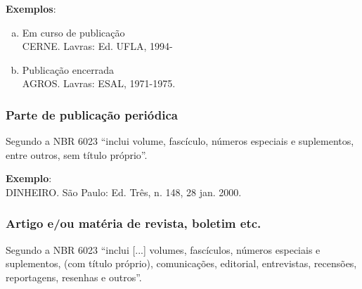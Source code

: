 \begin{exemplomanual}
\textbf{Exemplos}:\\
\begin{enumerate}[a)]
  \item  Em curso de publicação\\
CERNE. Lavras: Ed. UFLA, 1994-
  \item  Publicação encerrada\\
AGROS. Lavras: ESAL, 1971-1975.
\end{enumerate}
\end{exemplomanual}


\subsubsection{Parte de publicação periódica}

Segundo a NBR 6023 \cite{NBR6023:2002} ``inclui volume, fascículo, números especiais e suplementos, entre outros, sem título próprio''.

\begin{flushleft}
\begin{singlespace}
\end{singlespace}
\end{flushleft}

\begin{exemplomanual}
\textbf{Exemplo}:\\
DINHEIRO. São Paulo: Ed. Três, n. 148, 28 jan. 2000.
\end{exemplomanual}


\subsubsection{Artigo e/ou matéria de revista, boletim etc.}

Segundo a NBR 6023 \cite[p.6]{NBR6023:2002}``inclui [...] volumes, fascículos, números especiais e suplementos, (com título próprio), comunicações, editorial, entrevistas, recensões, reportagens, resenhas e outros''.

\begin{flushleft}
\begin{singlespace}
\end{singlespace}
\end{flushleft}

